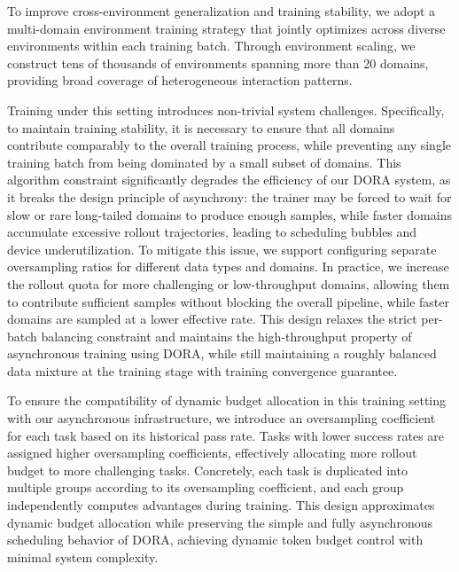 \documentclass{article}
\begin{document}
To improve cross-environment generalization and training stability, we adopt a multi-domain environment training strategy that jointly optimizes across diverse environments within each training batch.
Through environment scaling, we construct tens of thousands of environments spanning more than 20 domains, providing broad coverage of heterogeneous interaction patterns.

Training under this setting introduces non-trivial system challenges. 
Specifically, to maintain training stability, it is necessary to ensure that all domains contribute comparably to the overall training process, while preventing any single training batch from being dominated by a small subset of domains.
This algorithm constraint significantly degrades the efficiency of our DORA system, as it breaks the design principle of asynchrony: the trainer may be forced to wait for slow or rare long-tailed domains to produce enough samples, while faster domains accumulate excessive rollout trajectories, leading to scheduling bubbles and device underutilization.
To mitigate this issue, we support configuring separate oversampling ratios for different data types and domains. In practice, we increase the rollout quota for more challenging or low-throughput domains, allowing them to contribute sufficient samples without blocking the overall pipeline, while faster domains are sampled at a lower effective rate. This design relaxes the strict per-batch balancing constraint and maintains the high-throughput property of asynchronous training using DORA, while still maintaining a roughly balanced data mixture at the training stage with training convergence guarantee.

To ensure the compatibility of dynamic budget allocation in this training setting with our asynchronous infrastructure, we introduce an oversampling coefficient for each task based on its historical pass rate. 
Tasks with lower success rates are assigned higher oversampling coefficients, effectively allocating more rollout budget to more challenging tasks. 
Concretely, each task is duplicated into multiple groups according to its oversampling coefficient, and each group independently computes advantages during training. This design approximates dynamic budget allocation while preserving the simple and fully asynchronous scheduling behavior of DORA, achieving dynamic token budget control with minimal system complexity.
\end{document}
